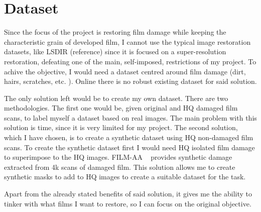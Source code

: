 \documentclass[openany, 12pt]{article}
\begin{document}
	\section{Dataset}
	\label{sec:Dataset}
{\color{blue}Since the focus of the project is restoring film damage while keeping the characteristic grain of developed film, I cannot use the typical image restoration datasets, like LSDIR (reference) since it is focused on a super-resolution restoration, defeating one of the main, self-imposed, restrictions of my project. 
		To achive the objective, I would need a dataset centred around film damage (dirt, hairs, scratches, etc. ). Online there is no robust existing dataset for said solution. 
		
		The only solution left would be to create my own dataset. There are two methodologies. The first one would be, given original and HQ damaged film scans, to label myself a dataset based on real images. The main problem with this solution is time, since it is very limited for my project. The second solution, which I have chosen, is to create a synthetic dataset using HQ non-damaged film scans. To create the synthetic dataset first I would need HQ isolated film damage to superimpose to the HQ images. FILM-AA ~\cite{ivanova23analogue} provides synthetic damage extracted from 4k scans of damaged film. This solution allows me to create synthetic masks to add to HQ images to create a suitable dataset for the task.
		
		Apart from the already stated benefits of said solution, it gives me the ability to tinker with what films I want to restore, so I can focus on the original objective.}\\
\end{document}
